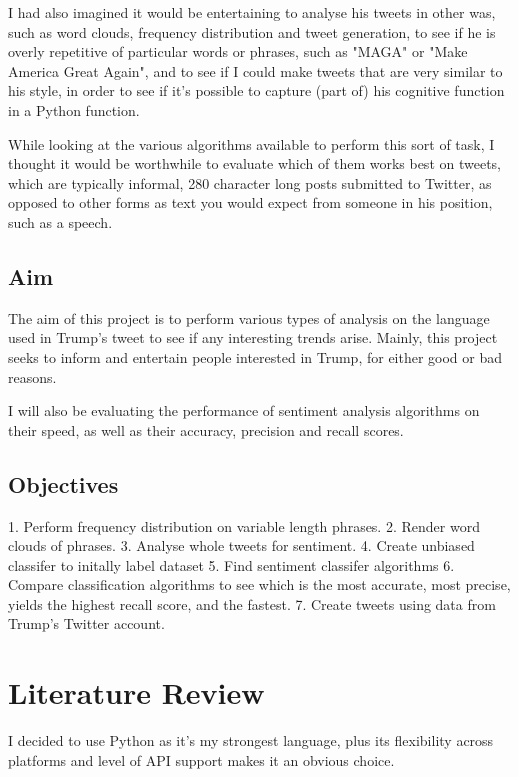 \documentclass{article}
\begin{document}
I had also imagined it would be entertaining to analyse his tweets in other was, such as word clouds, frequency distribution and tweet generation, to see if he is overly repetitive of particular words or phrases, such as "MAGA" or "Make America Great Again", and to see if I could make tweets that are very similar to his style, in order to see if it's possible to capture (part of) his cognitive function in a Python function.

While looking at the various algorithms available to perform this sort of task, I thought it would be worthwhile to evaluate which of them works best on tweets, which are typically informal, 280 character long posts submitted to Twitter, as opposed to other forms as text you would expect from someone in his position, such as a speech.

\subsection{Aim}

The aim of this project is to perform various types of analysis on the language used in Trump's tweet to see if any interesting trends arise.
Mainly, this project seeks to inform and entertain people interested in Trump, for either good or bad reasons.

I will also be evaluating the performance of sentiment analysis algorithms on their speed, as well as their accuracy, precision and recall scores.

\subsection{Objectives}

1.
Perform frequency distribution on variable length phrases.
2.
Render word clouds of phrases.
3.
Analyse whole tweets for sentiment.
4.
Create unbiased classifer to initally label dataset
5.
Find sentiment classifer algorithms
6.
Compare classification algorithms to see which is the most accurate, most precise, yields the highest recall score, and the fastest.
7.
Create tweets using data from Trump's Twitter account.

\newpage
\section{Literature Review}

I decided to use Python as it's my strongest language, plus its flexibility across platforms and level of API support makes it an obvious choice.
\end{document}
